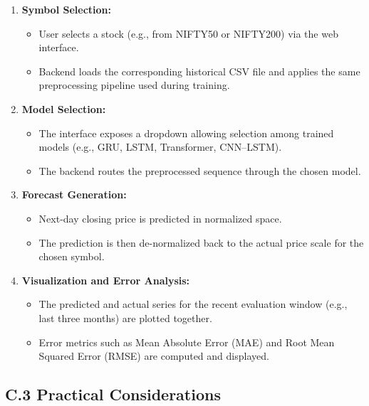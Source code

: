 \begin{enumerate}
    \item \textbf{Symbol Selection:}
    \begin{itemize}
        \item User selects a stock (e.g., from NIFTY50 or NIFTY200) via the web interface.
        \item Backend loads the corresponding historical CSV file and applies the same preprocessing pipeline used during training.
    \end{itemize}

    \item \textbf{Model Selection:}
    \begin{itemize}
        \item The interface exposes a dropdown allowing selection among trained models (e.g., GRU, LSTM, Transformer, CNN--LSTM).
        \item The backend routes the preprocessed sequence through the chosen model.
    \end{itemize}

    \item \textbf{Forecast Generation:}
    \begin{itemize}
        \item Next-day closing price is predicted in normalized space.
        \item The prediction is then de-normalized back to the actual price scale for the chosen symbol.
    \end{itemize}

    \item \textbf{Visualization and Error Analysis:}
    \begin{itemize}
        \item The predicted and actual series for the recent evaluation window (e.g., last three months) are plotted together.
        \item Error metrics such as Mean Absolute Error (MAE) and Root Mean Squared Error (RMSE) are computed and displayed.
    \end{itemize}
\end{enumerate}

\subsection*{C.3 Practical Considerations}

